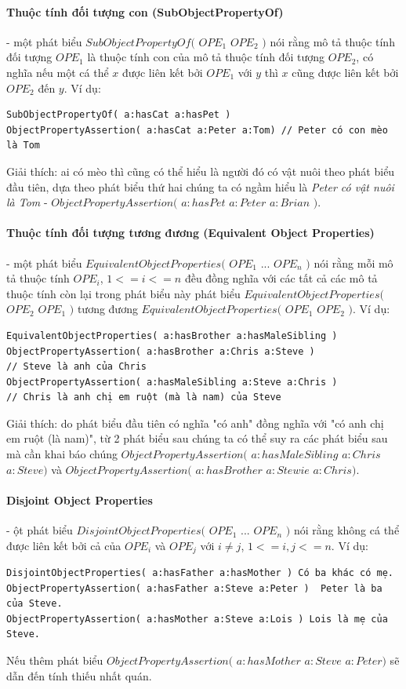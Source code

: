 \paragraph{Thuộc tính đối tượng con (SubObjectPropertyOf)} - một phát biểu $SubObjectPropertyOf($ $OPE_{1}$ $OPE_{2}$ $)$ nói rằng mô tả thuộc tính đối tượng $OPE_{1}$ là thuộc tính con của mô tả thuộc tính đối tượng $OPE_{2}$, có nghĩa nếu một cá thể $x$ được liên kết bởi $OPE_{1}$ với $y$ thì $x$ cũng được liên kết bởi $OPE_{2}$ đến $y$. Ví dụ:
\begin{verbatim}
SubObjectPropertyOf( a:hasCat a:hasPet )     
ObjectPropertyAssertion( a:hasCat a:Peter a:Tom) // Peter có con mèo là Tom
\end{verbatim}
Giải thích: ai có mèo thì cũng có thể hiểu là người đó có vật nuôi theo phát biểu đầu tiên, dựa theo phát biểu thứ hai chúng ta có ngầm hiểu là \textit{Peter có vật nuôi là Tom} - $ObjectPropertyAssertion($ $a:hasPet$ $a:Peter$ $a:Brian$ $)$.

\paragraph{Thuộc tính đối tượng tương đương (Equivalent Object Properties)} - một phát biểu $EquivalentObjectProperties($ $OPE_{1}$ ... $OPE_{n}$ $)$ nói rằng mỗi mô tả thuộc tính $OPE_{i}$, $1<=i<=n$ đều đồng nghĩa với các tất cả các mô tả thuộc tính còn lại trong phát biểu này phát biểu $EquivalentObjectProperties($ $OPE_{2}$ $OPE_{1}$ $)$ tương đương $EquivalentObjectProperties($ $OPE_{1}$ $OPE_{2}$ $)$. Ví dụ:
\begin{verbatim}
EquivalentObjectProperties( a:hasBrother a:hasMaleSibling ) 
ObjectPropertyAssertion( a:hasBrother a:Chris a:Steve )     
// Steve là anh của Chris
ObjectPropertyAssertion( a:hasMaleSibling a:Steve a:Chris ) 
// Chris là anh chị em ruột (mà là nam) của Steve
\end{verbatim}
Giải thích: do phát biểu đầu tiên có nghĩa "có anh" đồng nghĩa với "có anh chị em ruột (là nam)", từ 2 phát biểu sau chúng ta có thể suy ra các phát biểu sau mà cần khai báo chúng $ObjectPropertyAssertion($ $a:hasMaleSibling$ $a:Chris$ $a:Steve)$ và $ObjectPropertyAssertion($ $a:hasBrother$ $a:Stewie$ $a:Chris)$.

\paragraph{Disjoint Object Properties} - ột phát biểu $DisjointObjectProperties($ $OPE_{1}$ ... $OPE_{n}$ $)$ nói rằng không cá thể được liên kết bởi cả của $OPE_{i}$ và $OPE_{j}$ với $i \neq j$, $1<=i,j<=n$. Ví dụ:
\begin{verbatim}
DisjointObjectProperties( a:hasFather a:hasMother ) Có ba khác có mẹ.
ObjectPropertyAssertion( a:hasFather a:Steve a:Peter )	Peter là ba của Steve.
ObjectPropertyAssertion( a:hasMother a:Steve a:Lois ) Lois là mẹ của Steve.
\end{verbatim}
Nếu thêm phát biểu $ObjectPropertyAssertion($ $a:hasMother$ $a:Steve$ $a:Peter)$ sẽ dẫn đến tính thiếu nhất quán.

